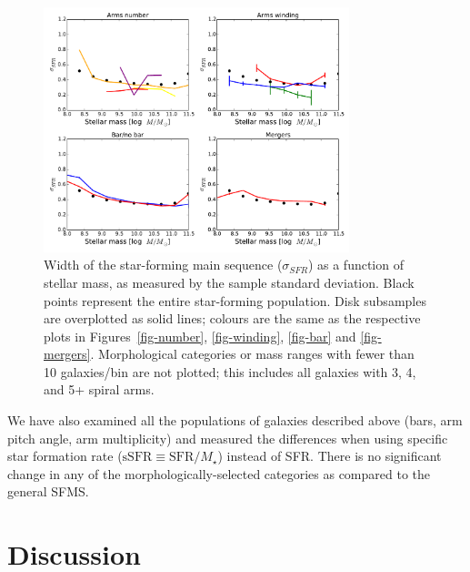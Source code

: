\documentclass[useAMS,usenatbib]{mn2e}
\def\rr{\color{titlecol}}
\begin{document}
\begin{figure}
\includegraphics[angle=0,width=3.5in]{figures/masslim/sigma_mstar.pdf}
\caption{Width of the star-forming main sequence ($\sigma_{SFR}$) as a function of stellar mass, as measured by the sample standard deviation. Black points represent the entire star-forming population. Disk subsamples are overplotted as solid lines; colours are the same as the respective plots in Figures~\ref{fig-number}, \ref{fig-winding}, \ref{fig-bar} and \ref{fig-mergers}. Morphological categories or mass ranges with fewer than 10 galaxies/bin are not plotted; this includes all galaxies with 3, 4, and 5+ spiral arms.
\label{fig-sigma}}
\end{figure}

We have {\rr also examined all the populations of galaxies described above (bars, arm pitch angle, arm multiplicity) and measured the differences when using specific star formation rate ($\textrm{sSFR}\equiv\textrm{SFR}/M_\star$) instead of SFR. There is no significant change in any of the morphologically-selected categories as compared to the general SFMS. }


\section{Discussion}\label{sec-discussion}
\end{document}
